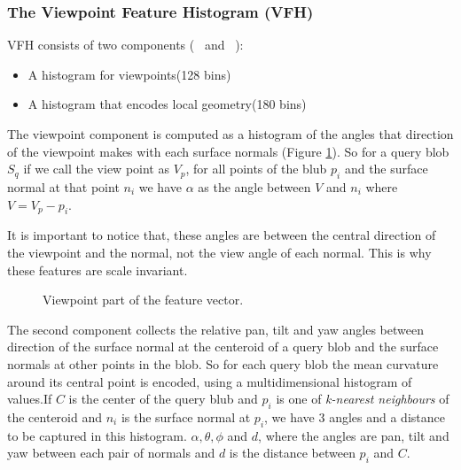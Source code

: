 \subsubsection*{The Viewpoint Feature Histogram (VFH)}
\label{VFH.ssec}
 

VFH consists of two components (~\cite{VFH_Definition} and ~\cite{5651280}):


\begin{itemize}
 \item A histogram for viewpoints(128 bins)
 \item A histogram that encodes local geometry(180 bins)
\end{itemize}

The viewpoint component is computed as a histogram of the angles that direction of the viewpoint  makes with each surface
normals (Figure \ref{VFH_ViewPoint_component.figure}). So for a query blob $S_q$ if we call the view point as $V_p$, for all points of the blub $p_i$ and the surface normal at that point $n_i$ we have $\alpha$ as the angle between $V$ and $n_i$ where $V = V_p - p_i$.


It is important to notice that, these angles are between the central direction of the viewpoint and the normal, not the view angle of
each normal. This is why these features are scale invariant.  

\begin{figure}[t]
  \caption[ViewPoint Component of VFH]
  {Viewpoint part of the feature vector.\cite{VFH_Definition}}
  \label{VFH_ViewPoint_component.figure}
\end{figure}

The second component collects the relative pan, tilt and yaw angles between direction of 
the surface normal at the centeroid of a query blob and the surface normals at other points in the blob.
So for each query blob the mean curvature around its central point is encoded, using a multidimensional histogram of values.If $C$ is the center of the query blub and $p_i$ is one of {\it k-nearest neighbours} of the centeroid and $n_i$ is the surface normal at $p_i$, we have 3 angles and a distance to be captured in this histogram. $\alpha,\theta, \phi$ and $d$, where the angles are pan, tilt and yaw between each pair of normals and $d$ is the distance between $p_i$ and $C$.  


